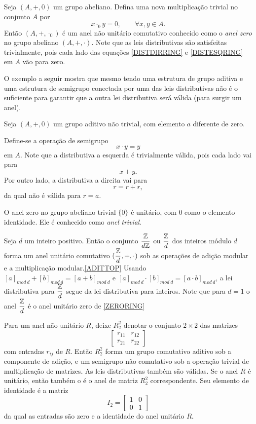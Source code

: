 \begin{exmp}
  Seja $(A, +, 0)$ um grupo abeliano. Defina uma nova multiplicação trivial no conjunto $A$ por $$ x \cdot_{0} y = 0, \quad \quad \forall x,y \in A.$$
  Então $(A, +, \cdot_{0})$ é um anel não unitário comutativo conhecido como o \emph{anel zero} no grupo abeliano $(A,+,\cdot)$. Note que as leis distributivas são satisfeitas trivialmente, pois cada lado das equações \ref{DISTDIRRING} e \ref{DISTESQRING} em $A$ vão para zero.
\end{exmp}
O exemplo a seguir mostra que mesmo tendo uma estrutura de grupo aditiva e uma estrutura de semigrupo conectada por uma das leis distributivas não é o suficiente para garantir que a outra lei distributiva será válida (para surgir um anel).
\begin{exmp}
  Seja $(A,+,0)$ um grupo aditivo não trivial, com elemento $a$ diferente de zero.

  Define-se a operação de semigrupo $$x\cdot y = y$$ em $A$. Note que a distributiva a esquerda é trivialmente válida, pois cada lado vai para $$x + y.$$ Por outro lado, a distributiva a direita vai para $$r = r + r,$$ da qual não é válida para $r=a$.
\end{exmp}

\begin{exmp}\label{ZERORING}
  O anel zero no grupo abeliano trivial $\{0\}$ é unitário, com $0$ como o elemento identidade. Ele é conhecido como \emph{anel trivial.}
\end{exmp}
\begin{exmp}
  Seja $d$ um inteiro positivo. Então o conjunto $\dfrac{\mathbb{Z}}{d\mathbb{Z}}$ ou $\dfrac{\mathbb{Z}}{d}$ dos inteiros módulo $d$ forma um anel unitário comutativo $(\dfrac{\mathbb{Z}}{d}, + , \cdot)$ sob as operações de adição modular e a multiplicação modular.\ref{ADITTOP} Usando $[a]_{mod\ d} + [b]_{mod\ d} = [a+b]_{mod\ d}$ e $[a]_{mod\ d} \cdot [b]_{mod\ d} = [a\cdot b]_{mod\ d}$, a lei distributiva para $\dfrac{\mathbb{Z}}{d}$ segue da lei distributiva para inteiros. Note que para $d=1$ o anel $\dfrac{\mathbb{Z}}{d}$ é o anel unitário zero de \ref{ZERORING}
\end{exmp}


\begin{exmp}
  Para um anel não unitário $R$, deixe $R^{2}_{2}$ denotar o conjunto $2\times 2$ das matrizes
  $$\begin{bmatrix}
    r_{11} & r_{12}\\
    r_{21} & r_{22}
  \end{bmatrix}$$
  com entradas $r_{ij}$ de $R$. Então $R^{2}_{2}$ forma um grupo comutativo aditivo sob a componente de adição, e um semigrupo não comutativo sob a operação trivial de multiplicação de matrizes. As leis distributivas também são válidas. Se o anel $R$ é unitário, então também o é o anel de matriz $R^{2}_{2}$ correspondente. Seu elemento de identidade é a matriz
  $$I_{2} =\begin{bmatrix}
    1 & 0\\
    0 & 1
  \end{bmatrix}$$ da qual as entradas são zero e a identidade do anel unitário $R$.

\end{exmp}

